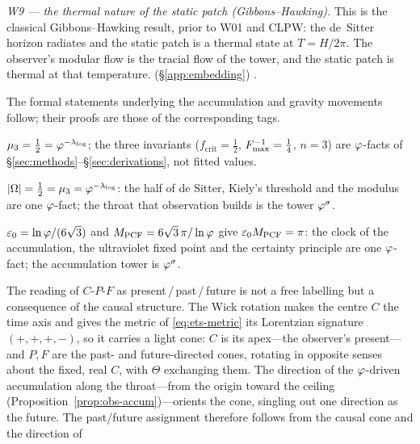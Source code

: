\emph{W9 --- the thermal nature of the static patch (Gibbons--Hawking).} This is the
classical Gibbons--Hawking result, prior to W01 and CLPW: the de~Sitter horizon radiates
and the static patch is a thermal state at $T=H/2\pi$. The observer's modular flow is the
tracial flow of the tower, and the static patch is thermal at that temperature.
(\S\ref{app:embedding}) \cite{GibbonsHawking77}.


\medskip
The formal statements underlying the accumulation and gravity movements follow; their
proofs are those of the corresponding  tags.
\begin{remark}
$\mu_3=\tfrac12=\varphi^{-\lambda_{\log}}$; the three invariants ($f_{\mathrm{crit}}=\tfrac12$,
$F_{\max}^{-1}=\tfrac14$, $n=3$) are $\varphi$-facts of \S\ref{sec:methods}--\S\ref{sec:derivations},
not fitted values.
\end{remark}\begin{remark}
$|\Omega|=\tfrac12=\mu_3=\varphi^{-\lambda_{\log}}$: the half of de Sitter, Kiely's threshold and the modulus
are one $\varphi$-fact; the throat that observation builds is the tower $\varphi^{\sigma}$.
\end{remark}\begin{remark}
$\varepsilon_{0}=\ln\varphi/(6\sqrt3)$ and $M_{\mathrm{PCF}}=6\sqrt3\,\pi/\ln\varphi$ give $\varepsilon_{0}M_{\mathrm{PCF}}=\pi$: the clock
of the accumulation, the ultraviolet fixed point and the certainty principle are one
$\varphi$-fact; the accumulation tower is $\varphi^{\sigma}$.
\end{remark}\begin{remark}
The reading of $C$-$P$-$F$ as present\,/\,past\,/\,future is not a free labelling but a consequence
of the causal structure. The Wick rotation makes the centre $C$ the time axis and gives the metric
of \eqref{eq:ets-metric} its Lorentzian signature $(+,+,+,-)$, so it carries a light cone: $C$ is
its apex---the observer's present---and $P,F$ are the past- and future-directed cones, rotating in
opposite senses about the fixed, real $C$, with $\Theta$ exchanging them. The direction of the
$\varphi$-driven accumulation along the throat---from the origin toward the ceiling
(Proposition~\ref{prop:obs-accum})---orients the cone, singling out one direction as the future.
The past/future assignment therefore follows from the causal cone and the direction of

\end{remark}
